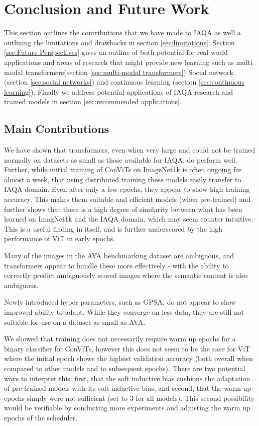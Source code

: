 \chapter{Conclusion and Future Work}
\label{chap:Conclusion}
This section outlines the contributions that we have made to IAQA as well a outlining the limitations and drawbacks in section \ref{sec:limitations}. Section \ref{sec:Future Perspectives} gives an outline of both potential for real world applications and areas of research that might provide new learning such as multi modal transformers(section \ref{sec:multi-modal transformers}) Social network (section \ref{sec:social networks}) and continuous learning (section \ref{sec:continuous learning}). Finally we address potential applications of IAQA research and trained models in section \ref{sec:recommended applications}.

\section{Main Contributions}
\label{main_contributions} 

We have shown that transformers, even when very large and could not be trained normally on datasets as small as those available for IAQA, do perform well. Further, while initial training of ConViTs on ImageNet1k is often ongoing for almost a week, that using distributed training these models easily transfer to IAQA domain. Even after only a few epochs, they appear to show high training accuracy. This makes them suitable and efficient models (when pre-trained) and further shows that there is a high degree of similarity between what has been learned on ImagNet1k and the IAQA domain, which may seem counter intuitive. This is a useful finding in itself, and is further underscored by the high performance of ViT in early epochs. 

Many of the images in the AVA benchmarking dataset are ambiguous, and transformers appear to handle these more effectively - with the ability to correctly predict ambiguously scored images where the semantic content is also ambiguous. 

Newly introduced hyper parameters, such as GPSA, do not appear to show improved ability to adapt. While they converge on less data, they are still not suitable for use on a dataset as small as AVA.

We showed that training does not necessarily require warm up epochs for a binary classifier for ConViTs, however this does not seem to be the case for ViT where the initial epoch shows the highest validation accuracy (both overall when compared to other models and to subsequent epochs). There are two potential ways to interpret this: first, that the soft inductive bias cushions the adaptation of pre-trained models with its soft inductive bias, and second, that the warm up epochs simply were not sufficient (set to 3 for all models). This second possibility would be verifiable by conducting more experiments and adjusting the warm up epochs of the scheduler. 

